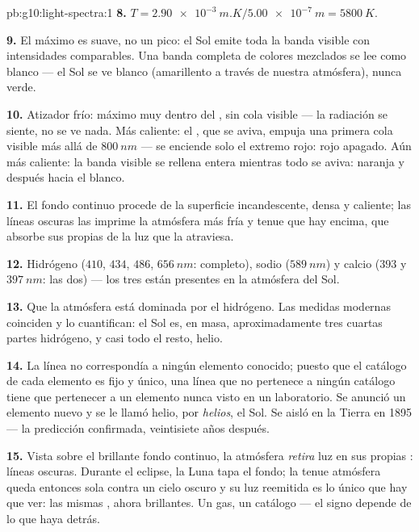 \begin{solution}{pb:g10:light-spectra:1}
\textbf{8.} $T = \qty{2.90e-3}{m.K} / \qty{5.00e-7}{m} = \qty{5800}{K}$.

\textbf{9.} El máximo es suave, no un pico: el Sol emite toda la banda
visible con intensidades comparables. Una banda completa de colores
mezclados se lee como blanco --- el Sol se ve blanco (amarillento a
través de nuestra atmósfera), nunca verde.

\textbf{10.} Atizador frío: máximo muy dentro del , sin cola
visible --- la radiación se siente, no se ve nada. Más caliente: el
, que se aviva, empuja una primera cola visible más allá de
$\qty{800}{nm}$ --- se enciende solo el extremo rojo: rojo apagado. Aún
más caliente: la banda visible se rellena entera mientras todo se aviva:
naranja y después hacia el blanco.

\textbf{11.} El fondo continuo procede de la superficie incandescente,
densa y caliente; las líneas oscuras las imprime la atmósfera más fría y
tenue que hay encima, que absorbe sus propias  de la
luz que la atraviesa.

\textbf{12.} Hidrógeno ($410$, $434$, $486$, $\qty{656}{nm}$: completo),
sodio ($\qty{589}{nm}$) y calcio ($393$ y $\qty{397}{nm}$: las dos) ---
los tres están presentes en la atmósfera del Sol.

\textbf{13.} Que la atmósfera está dominada por el hidrógeno. Las
medidas modernas coinciden y lo cuantifican: el Sol es, en masa,
aproximadamente tres cuartas partes hidrógeno, y casi todo el resto,
helio.

\textbf{14.} La línea no correspondía a ningún elemento conocido; puesto
que el catálogo de cada elemento es fijo y único, una línea que no
pertenece a ningún catálogo tiene que pertenecer a un elemento nunca
visto en un laboratorio. Se anunció un elemento nuevo y se le llamó
helio, por \emph{helios}, el Sol. Se aisló en la Tierra en 1895 --- la
predicción confirmada, veintisiete años después.

\textbf{15.} Vista sobre el brillante fondo continuo, la atmósfera
\emph{retira} luz en sus propias : líneas oscuras.
Durante el eclipse, la Luna tapa el fondo; la tenue atmósfera queda
entonces sola contra un cielo oscuro y su luz reemitida es lo único que
hay que ver: las mismas , ahora brillantes. Un gas, un
catálogo --- el signo depende de lo que haya detrás.


\end{solution}
